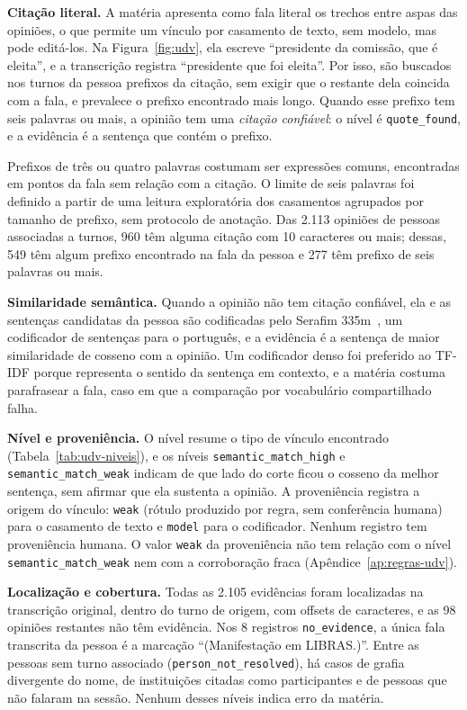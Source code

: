 

\textbf{Citação literal.} A matéria apresenta como fala literal os trechos entre aspas das opiniões,
o que permite um vínculo por casamento de texto, sem modelo, mas pode editá-los. Na
Figura~\ref{fig:udv}, ela escreve ``presidente da comissão, que é eleita'', e a transcrição registra
``presidente que foi eleita''. Por isso, são buscados nos turnos da pessoa prefixos da citação, sem
exigir que o restante dela coincida com a fala, e prevalece o prefixo encontrado mais longo. Quando
esse prefixo tem seis palavras ou mais, a opinião tem uma \emph{citação confiável}: o nível é
\texttt{quote\_found}, e a evidência é a sentença que contém o prefixo.

Prefixos de três ou quatro palavras costumam ser expressões comuns, encontradas em pontos da fala sem
relação com a citação. O limite de seis palavras foi definido a partir de uma leitura exploratória
dos casamentos agrupados por tamanho de prefixo, sem protocolo de anotação. Das 2.113 opiniões de
pessoas associadas a turnos, 960 têm alguma citação com 10 caracteres ou mais; dessas, 549 têm algum
prefixo encontrado na fala da pessoa e 277 têm prefixo de seis palavras ou mais.

\textbf{Similaridade semântica.} Quando a opinião não tem citação confiável, ela e as sentenças
candidatas da pessoa são codificadas pelo Serafim 335m~\citep{gomes2024serafim}, um codificador de
sentenças para o português, e a evidência é a sentença de maior similaridade de cosseno com a
opinião. Um codificador denso foi preferido ao TF-IDF porque representa o sentido da sentença em
contexto, e a matéria costuma parafrasear a fala, caso em que a comparação por vocabulário
compartilhado falha.

\textbf{Nível e proveniência.} O nível resume o tipo de vínculo encontrado
(Tabela~\ref{tab:udv-niveis}), e os níveis \texttt{semantic\_match\_high} e
\texttt{semantic\_match\_weak} indicam de que lado do corte ficou o cosseno da melhor sentença, sem
afirmar que ela sustenta a opinião. A proveniência registra a origem do vínculo: \texttt{weak}
(rótulo produzido por regra, sem conferência humana) para o casamento de texto e \texttt{model} para
o codificador. Nenhum registro tem proveniência humana. O valor \texttt{weak} da proveniência não tem
relação com o nível \texttt{semantic\_match\_weak} nem com a corroboração fraca
(Apêndice~\ref{ap:regras-udv}).

\textbf{Localização e cobertura.} Todas as 2.105 evidências foram localizadas na transcrição
original, dentro do turno de origem, com offsets de caracteres, e as 98 opiniões restantes não têm
evidência. Nos 8 registros \texttt{no\_evidence}, a única fala transcrita da pessoa é a marcação
``(Manifestação em LIBRAS.)''. Entre as pessoas sem turno associado (\texttt{person\_not\_resolved}),
há casos de grafia divergente do nome, de instituições citadas como participantes e de pessoas que
não falaram na sessão. Nenhum desses níveis indica erro da matéria.

